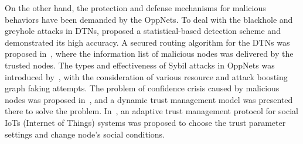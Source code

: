 On the other hand,
the protection and defense mechanisms for malicious behaviors have
been demanded by the OppNets.
To deal with the blackhole and greyhole attacks
in DTNs,
\cite{Pham2016Detecting} proposed
a statistical-based detection scheme and
demonstrated its high accuracy.
A secured routing algorithm for the DTNs
was proposed in~\cite{Saha2018Design},
where the information list of malicious nodes
was delivered by the trusted nodes.
The types and effectiveness of Sybil attacks in OppNets
was introduced by~\cite{Sacha2016Stalk},
with the consideration of various resource and
attack boosting graph faking attempts.
The problem of confidence crisis caused by malicious nodes
was proposed in~\cite{Yao2016Secure},
and a dynamic trust management model
was presented there to solve the problem.
In~\cite{Chen2016Trust},
an adaptive trust management
protocol for social IoTs (Internet of Things) systems was proposed
to choose the trust parameter settings and change node's social conditions.
%
